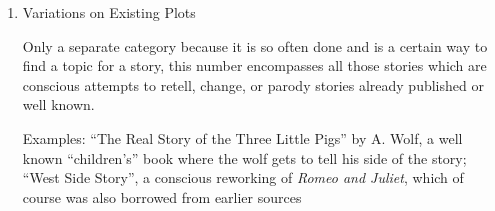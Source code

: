 \documentclass[12pt]{article}
\newcommand{\litem}[1]{\item{\large #1} \nopagebreak}
\newcommand{\eg}{Examples: }
\newcommand{\book}[1]{\textit{#1}}
\newcommand{\story}[1]{``#1''}
\begin{document}
\begin{enumerate}
\litem{Variations on Existing Plots}

Only a separate category because it is so often done and is
a certain way to find a topic for a story, this number
encompasses all those stories which are conscious attempts
to retell, change, or parody stories already published or
well known.

\eg \story{The Real Story of the Three Little Pigs} by A.
Wolf, a well known ``children's'' book where the wolf gets to
tell his side of the story; \story{West Side Story}, a
conscious reworking of \book{Romeo and Juliet}, which of
course was also borrowed from earlier sources



\end{enumerate}
\end{document}

